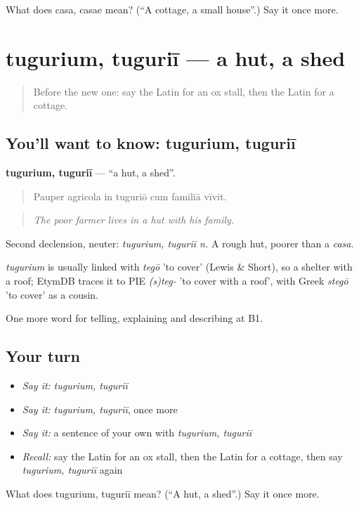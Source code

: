 \begin{tcolorbox}[breakable,colback=teal!4,colframe=teal!35!black,title={Before you move on}]
What does casa, casae mean? (\textquotedblleft{}A cottage, a small house\textquotedblright{}.) Say it once more.
\end{tcolorbox}
\section[tugurium, tuguriī]{tugurium, tuguriī — a hut, a shed}

\label{lesson:LA-C473-tugurium}



\begin{quote}
Before the new one: say the Latin for an ox stall, then the Latin for a cottage.
\end{quote}

\subsection*{You'll want to know: tugurium, tuguriī}
\textbf{tugurium, tuguriī} — \textquotedblleft{}a hut, a shed\textquotedblright{}.

\begin{quote}
Pauper agricola in tuguriō cum familiā vīvit.
\end{quote}

\begin{quote}
\emph{The poor farmer lives in a hut with his family.}
\end{quote}

Second declension, neuter: \emph{tugurium, tuguriī n.} A rough hut, poorer than a \emph{casa}.

\begin{cousinweb}
\emph{tugurium} is usually linked with \emph{tegō} 'to cover' (Lewis \& Short), so a shelter with a roof; EtymDB traces it to PIE \emph{(s)teg-} 'to cover with a roof', with Greek \emph{stegō} 'to cover' as a cousin.
\end{cousinweb}

\begin{grammarlens}[title={What you've built}]
One more word for telling, explaining and describing at B1.
\end{grammarlens}

\subsection*{Your turn}
\begin{itemize}
\raggedright
  \item \emph{Say it:} \emph{tugurium, tuguriī}
  \item \emph{Say it:} \emph{tugurium, tuguriī}, once more
  \item \emph{Say it:} a sentence of your own with \emph{tugurium, tuguriī}
  \item \emph{Recall:} say the Latin for an ox stall, then the Latin for a cottage, then say \emph{tugurium, tuguriī} again
\end{itemize}

\begin{tcolorbox}[breakable,colback=teal!4,colframe=teal!35!black,title={Before you move on}]
What does tugurium, tuguriī mean? (\textquotedblleft{}A hut, a shed\textquotedblright{}.) Say it once more.
\end{tcolorbox}
